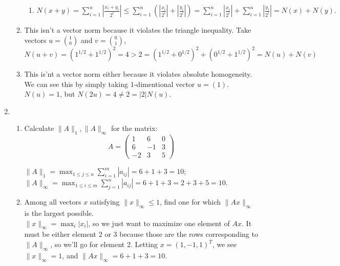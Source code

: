 \documentclass[11pt]{article}
\newcommand{\n}{\vspace{0.2cm}}
\begin{document}
\begin{enumerate}
\begin{enumerate}[label=(\alph*)]
\begin{enumerate}
			            \item \(N(x+y) = \displaystyle\sum_{i=1}^{n} \left| \frac{x_i + y_i}{2^i} \right| \leq \sum_{i=1}^n \left( \left| \frac{x_i}{2^i} \right| + \left| \frac{y_i}{2^i} \right| \right) = \sum_{i=1}^n \left| \frac{x_i}{2^i} \right| + \sum_{i=1}^n \left| \frac{y_i}{2^i} \right| = N(x) + N(y).\)
		            \end{enumerate}
		      \item This isn't a vector norm because it violates the triangle inequality.  Take vectors \(u = \binom10\) and \(v = \binom01\),
		            \[N(u+v) = \left(1^{1/2} + 1^{1/2}\right)^2 = 4 > 2 = \left(1^{1/2} + 0^{1/2}\right)^2 + \left(0^{1/2} + 1^{1/2}\right)^2 = N(u) + N(v)\]
		      \item This is'nt a vector norm either because it violates absolute homogeneity.  We can see this by simply taking 1-dimentional vector \(u = (1)\).  \(N(u) = 1\), but \(N(2u) = 4 \neq 2 = |2|N(u)\).
	      \end{enumerate}

	\item \begin{enumerate}[label=(\alph*)]
		      \item Calculate \(\lVert A \rVert_1, \lVert A \rVert_\infty\) for the matrix:
		            \[A = \begin{pmatrix} 1 & 6 & 0 \\ 6 & -1 & 3 \\ -2 & 3 & 5 \end{pmatrix}\]
		            \begin{multicols}{2}
			            \(\lVert A \rVert_1 = \displaystyle\max_{1 \leq j \leq n} \sum_{i=1}^m |a_{ij}| = 6 + 1 + 3 = 10\);
			            \(\lVert A \rVert_\infty = \displaystyle\max_{1 \leq i \leq m} \sum_{j=1}^n |a_{ij}| = 6 + 1 + 3 = 2 + 3 + 5 = 10\).
		            \end{multicols}
		      \item Among all vectors \(x\) satisfying \(\lVert x \rVert_\infty \leq 1\), find one for which \(\lVert Ax \rVert_\infty\) is the largest possible. \n\\
		            \(\lVert x \rVert_\infty = \displaystyle\max_i |x_i|\), so we just want to maximize one element of \(Ax\).  It must be either element 2 or 3 because those are the rows corresponding to \(\lVert A \rVert_\infty\), so we'll go for element 2.  Letting \(x = (1,-1,1)^T\), we see \(\lVert x \rVert_\infty = 1\), and \(\lVert Ax \rVert_\infty = 6 + 1 + 3 = 10\).


\end{enumerate}
\end{enumerate}
\end{document}
